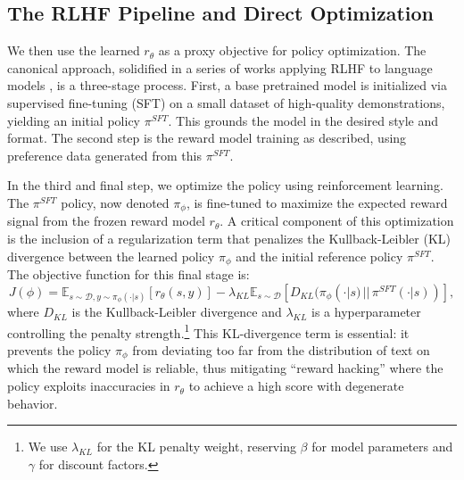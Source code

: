 \subsection{The RLHF Pipeline and Direct Optimization}

We then use the learned $r_\theta$ as a proxy objective for policy optimization. The canonical approach, solidified in a series of works applying RLHF to language models \citep{ziegler2019fine,stiennon2020learning,ouyang2022training}, is a three-stage process. First, a base pretrained model is initialized via supervised fine-tuning (SFT) on a small dataset of high-quality demonstrations, yielding an initial policy $\pi^{SFT}$. This grounds the model in the desired style and format. The second step is the reward model training as described, using preference data generated from this $\pi^{SFT}$.

In the third and final step, we optimize the policy using reinforcement learning. The $\pi^{SFT}$ policy, now denoted $\pi_\phi$, is fine-tuned to maximize the expected reward signal from the frozen reward model $r_\theta$. A critical component of this optimization is the inclusion of a regularization term that penalizes the Kullback-Leibler (KL) divergence between the learned policy $\pi_\phi$ and the initial reference policy $\pi^{SFT}$. The objective function for this final stage is:
\begin{equation}
    J(\phi) = \mathbb{E}_{s \sim \mathcal{D}, y \sim \pi_\phi(\cdot|s)} [r_\theta(s, y)] - \lambda_{KL} \mathbb{E}_{s \sim \mathcal{D}} [D_{KL}(\pi_\phi(\cdot|s) \,||\, \pi^{SFT}(\cdot|s))],
\label{eq:rlhf_objective}
\end{equation}
where $D_{KL}$ is the Kullback-Leibler divergence and $\lambda_{KL}$ is a hyperparameter controlling the penalty strength.\footnote{We use $\lambda_{KL}$ for the KL penalty weight, reserving $\beta$ for model parameters and $\gamma$ for discount factors.} This KL-divergence term is essential: it prevents the policy $\pi_\phi$ from deviating too far from the distribution of text on which the reward model is reliable, thus mitigating ``reward hacking'' where the policy exploits inaccuracies in $r_\theta$ to achieve a high score with degenerate behavior.

